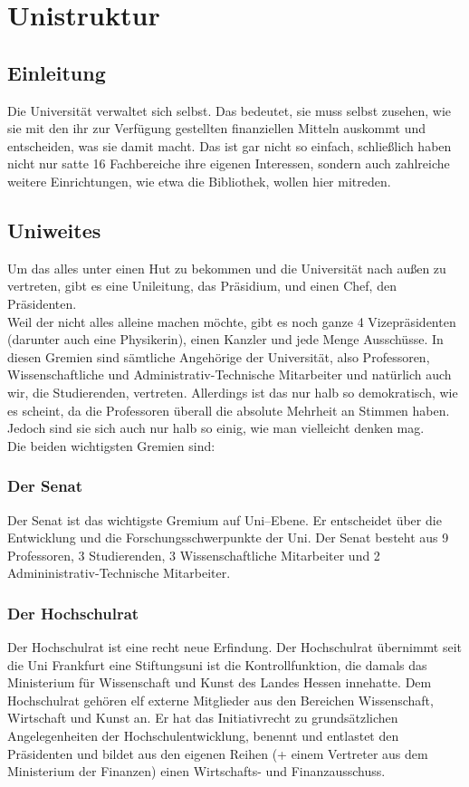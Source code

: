 \section{Unistruktur}

\subsection{Einleitung}
Die Universität verwaltet sich selbst. Das bedeutet, sie muss selbst zusehen, wie sie mit den ihr zur Verfügung gestellten finanziellen Mitteln auskommt und entscheiden, was sie damit macht. Das ist gar nicht so einfach, schlie\ss lich haben nicht nur satte 16 Fachbereiche ihre eigenen Interessen, sondern auch zahlreiche weitere Einrichtungen, wie etwa die Bibliothek, wollen hier mitreden.

\subsection{Uniweites}
Um das alles unter einen Hut zu bekommen und die Universität nach au\ss en zu vertreten, gibt es eine Unileitung, das Präsidium, und einen Chef, den Präsidenten.\\
Weil der nicht alles alleine machen möchte, gibt es noch ganze 4 Vizepräsidenten (darunter auch eine Physikerin), einen Kanzler und jede Menge Ausschüsse. In diesen Gremien sind sämtliche Angehörige der Universität, also Professoren, Wissenschaftliche und Administrativ-Technische Mitarbeiter und natürlich auch wir, die Studierenden, vertreten. Allerdings ist das nur halb so demokratisch, wie es scheint, da die Professoren überall die absolute Mehrheit an Stimmen haben. Jedoch sind sie sich auch nur halb so einig, wie man vielleicht denken mag.\\
Die beiden wichtigsten Gremien sind:

\subsubsection{Der Senat}
Der Senat ist das wichtigste Gremium auf Uni--Ebene. Er entscheidet über die Entwicklung und die Forschungsschwerpunkte der Uni. Der Senat besteht aus 9 Professoren, 3 Studierenden, 3 Wissenschaftliche Mitarbeiter und 2 Admininistrativ-Technische Mitarbeiter.

\subsubsection{Der Hochschulrat}
Der Hochschulrat ist eine recht neue Erfindung. Der Hochschulrat übernimmt seit die Uni Frankfurt eine Stiftungsuni ist die Kontrollfunktion, die damals das Ministerium für Wissenschaft und Kunst des Landes Hessen innehatte. Dem Hochschulrat gehören elf externe Mitglieder aus den Bereichen Wissenschaft, Wirtschaft und Kunst an. Er hat das Initiativrecht zu grundsätzlichen Angelegenheiten der Hochschulentwicklung, benennt und entlastet den Präsidenten und bildet aus den eigenen Reihen (+ einem Vertreter aus dem Ministerium der Finanzen) einen Wirtschafts- und Finanzausschuss.

